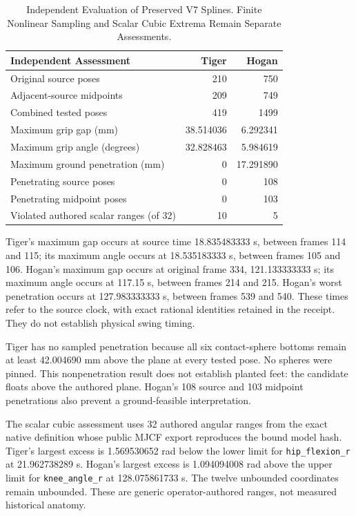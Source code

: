\documentclass[11pt,letterpaper]{article}
\newcommand{\code}[1]{\nolinkurl{#1}}
\begin{document}
\begin{table}[ht]
\centering\small
\begin{tabular}{@{}lrr@{}}
\toprule Independent Assessment & Tiger & Hogan\\\midrule
Original source poses & 210 & 750\\
Adjacent-source midpoints & 209 & 749\\
Combined tested poses & 419 & 1499\\
Maximum grip gap (mm) & 38.514036 & 6.292341\\
Maximum grip angle (degrees) & 32.828463 & 5.984619\\
Maximum ground penetration (mm) & 0 & 17.291890\\
Penetrating source poses & 0 & 108\\
Penetrating midpoint poses & 0 & 103\\
Violated authored scalar ranges (of 32) & 10 & 5\\
\bottomrule
\end{tabular}
\caption{Independent Evaluation of Preserved V7 Splines. Finite Nonlinear
Sampling and Scalar Cubic Extrema Remain Separate Assessments.}
\end{table}

Tiger's maximum gap occurs at source time 18.835483333 s, between frames 114
and 115; its maximum angle occurs at 18.535183333 s, between frames 105 and
106. Hogan's maximum gap occurs at original frame 334, 121.133333333 s; its
maximum angle occurs at 117.15 s, between frames 214 and 215. Hogan's worst
penetration occurs at 127.983333333 s, between frames 539 and 540. These times
refer to the source clock, with exact rational identities retained in the
receipt. They do not establish physical swing timing.

Tiger has no sampled penetration because all six contact-sphere bottoms remain
at least 42.004690 mm above the plane at every tested pose. No spheres were
pinned. This nonpenetration result does not establish planted feet: the
candidate floats above the authored plane. Hogan's 108 source and 103 midpoint
penetrations also prevent a ground-feasible interpretation.

The scalar cubic assessment uses 32 authored angular ranges from the exact
native definition whose public MJCF export reproduces the bound model hash.
Tiger's largest excess is 1.569530652 rad below the lower limit for
\code{hip_flexion_r} at 21.962738289 s. Hogan's largest excess is
1.094094008 rad above the upper limit for \code{knee_angle_r} at
128.075861733 s. The twelve unbounded coordinates remain unbounded.
These are generic operator-authored ranges, not measured historical anatomy.
\end{document}
